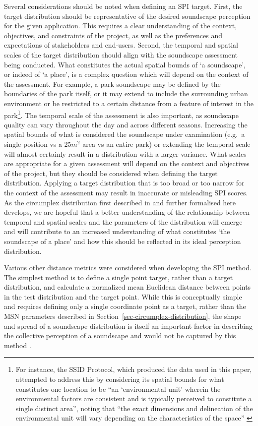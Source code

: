 \documentclass[
  authoryear,
  3p]{elsarticle}
\begin{document}
Several considerations should be noted when defining an SPI target.
First, the target distribution should be representative of the desired
soundscape perception for the given application. This requires a clear
understanding of the context, objectives, and constraints of the
project, as well as the preferences and expectations of stakeholders and
end-users. Second, the temporal and spatial scales of the target
distribution should align with the soundscape assessment being
conducted. What constitutes the actual spatial bounds of `a soundscape',
or indeed of `a place', is a complex question which will depend on the
context of the assessment. For example, a park soundscape may be defined
by the boundaries of the park itself, or it may extend to include the
surrounding urban environment or be restricted to a certain distance
from a feature of interest in the park\footnote{For instance, the SSID
  Protocol, which produced the data used in this paper, attempted to
  address this by considering its spatial bounds for what constitutes
  one location to be ``an `environmental unit' wherein the environmental
  factors are consistent and is typically perceived to constitute a
  single distinct area'', noting that ``the exact dimensions and
  delineation of the environmental unit will vary depending on the
  characteristics of the space'' \citep{Mitchell2020Soundscape}}. The
temporal scale of the assessment is also important, as soundscape
quality can vary throughout the day and across different seasons.
Increasing the spatial bounds of what is considered the soundscape under
examination (e.g.~a single position vs a 25\(m^2\) area vs an entire
park) or extending the temporal scale will almost certainly result in a
distribution with a larger variance. What scales are appropriate for a
given assessment will depend on the context and objectives of the
project, but they should be considered when defining the target
distribution. Applying a target distribution that is too broad or too
narrow for the context of the assessment may result in inaccurate or
misleading SPI scores. As the circumplex distribution first described in
\citet{Mitchell2022How} and further formalised here develops, we are
hopeful that a better understanding of the relationship between temporal
and spatial scales and the parameters of the distribution will emerge
and will contribute to an increased understanding of what constitutes
`the soundscape of a place' and how this should be reflected in its
ideal perception distribution.

Various other distance metrics were considered when developing the SPI
method. The simplest method is to define a single point target, rather
than a target distribution, and calculate a normalized mean Euclidean
distance between points in the test distribution and the target point.
While this is conceptually simple and requires defining only a single
coordinate point as a target, rather than the MSN parameters described
in Section~\ref{sec-circumplex-distribution}, the shape and spread of a
soundscape distribution is itself an important factor in describing the
collective perception of a soundscape and would not be captured by this
method \citep{Mitchell2022How}.
\end{document}

